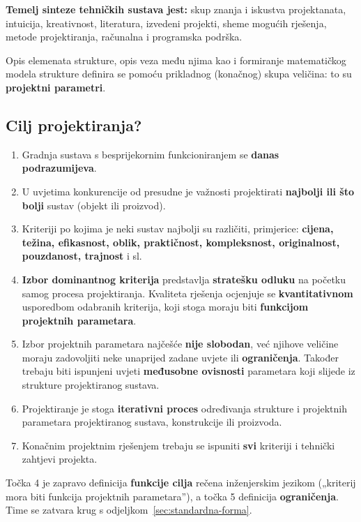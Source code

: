 \textbf{Temelj sinteze tehničkih sustava jest:} skup znanja i iskustva
projektanata, intuicija, kreativnost, literatura, izvedeni projekti, sheme
mogućih rješenja, metode projektiranja, računalna i programska podrška.

Opis elemenata strukture, opis veza među njima kao i formiranje matematičkog
modela strukture definira se pomoću prikladnog (konačnog) skupa veličina: to su
\textbf{projektni parametri}.

\subsection{Cilj projektiranja?}

\begin{enumerate}
  \item Gradnja sustava s besprijekornim funkcioniranjem se \textbf{danas
        podrazumijeva}.
  \item U uvjetima konkurencije od presudne je važnosti projektirati
        \textbf{najbolji ili što bolji} sustav (objekt ili proizvod).
  \item Kriteriji po kojima je neki sustav najbolji su različiti, primjerice:
        \textbf{cijena, težina, efikasnost, oblik, praktičnost, kompleksnost,
        originalnost, pouzdanost, trajnost} i sl.
  \item \textbf{Izbor dominantnog kriterija} predstavlja \textbf{stratešku
        odluku} na početku samog procesa projektiranja. Kvaliteta rješenja
        ocjenjuje se \textbf{kvantitativnom} usporedbom odabranih kriterija,
        koji stoga moraju biti \textbf{funkcijom projektnih parametara}.
  \item Izbor projektnih parametara najčešće \textbf{nije slobodan}, već njihove
        veličine moraju zadovoljiti neke unaprijed zadane uvjete ili
        \textbf{ograničenja}. Također trebaju biti ispunjeni uvjeti
        \textbf{međusobne ovisnosti} parametara koji slijede iz strukture
        projektiranog sustava.
  \item Projektiranje je stoga \textbf{iterativni proces} određivanja strukture
        i projektnih parametara projektiranog sustava, konstrukcije ili
        proizvoda.
  \item Konačnim projektnim rješenjem trebaju se ispuniti \textbf{svi} kriteriji
        i tehnički zahtjevi projekta.
\end{enumerate}

Točka 4 je zapravo definicija \textbf{funkcije cilja} rečena inženjerskim
jezikom („kriterij mora biti funkcija projektnih parametara”), a točka 5
definicija \textbf{ograničenja}. Time se zatvara krug s
odjeljkom~\ref{sec:standardna-forma}.

